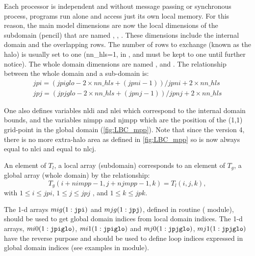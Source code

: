 \documentclass[../main/NEMO_manual]{subfiles}
\begin{document}
Each processor is independent and without message passing or synchronous process, programs run alone and access just its own local memory.
For this reason,
the main model dimensions are now the local dimensions of the subdomain (pencil) that are named , , .
These dimensions include the internal domain and the overlapping rows.
The number of rows to exchange (known as the halo) is usually set to one (nn\_hls=1, in ,
and must be kept to one until further notice).
The whole domain dimensions are named ,  and .
The relationship between the whole domain and a sub-domain is:
\begin{gather*}
  jpi = ( jpiglo-2\times nn\_hls + (jpni-1) ) / jpni + 2\times nn\_hls \\
  jpj = ( jpjglo-2\times nn\_hls + (jpnj-1) ) / jpnj + 2\times nn\_hls
\end{gather*}

One also defines variables nldi and nlei which correspond to the internal domain bounds, and the variables nimpp and njmpp which are the position of the (1,1) grid-point in the global domain (\autoref{fig:LBC_mpp}). Note that since the version 4, there is no more extra-halo area as defined in \autoref{fig:LBC_mpp} so  is now always equal to nlci and  equal to nlcj.

An element of $T_{l}$, a local array (subdomain) corresponds to an element of $T_{g}$,
a global array (whole domain) by the relationship:
\[
  T_{g} (i+nimpp-1,j+njmpp-1,k) = T_{l} (i,j,k),
\]
with $1 \leq i \leq jpi$, $1  \leq j \leq jpj $ , and  $1  \leq k \leq jpk$.

The 1-d arrays $mig(1:\jp{jpi})$ and $mjg(1:\jp{jpj})$, defined in  routine ( module), should be used to get global domain indices from local domain indices. The 1-d arrays, $mi0(1:\jp{jpiglo})$, $mi1(1:\jp{jpiglo})$ and $mj0(1:\jp{jpjglo})$, $mj1(1:\jp{jpjglo})$ have the reverse purpose and should be used to define loop indices expressed in global domain indices (see examples in  module).\\
\end{document}
